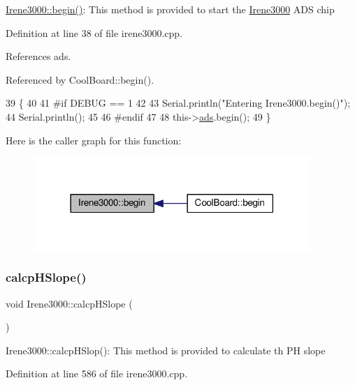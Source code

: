 \hyperlink{classIrene3000_ad5891806c500ae1007afe52b9e304c2b}{Irene3000\+::begin()}\+: This method is provided to start the \hyperlink{classIrene3000}{Irene3000} A\+DS chip 

Definition at line 38 of file irene3000.\+cpp.



References ads.



Referenced by Cool\+Board\+::begin().


\begin{DoxyCode}
39 \{
40 
41 \textcolor{preprocessor}{#if DEBUG == 1 }
42 
43     Serial.println(\textcolor{stringliteral}{"Entering Irene3000.begin()"});
44     Serial.println();
45 
46 \textcolor{preprocessor}{#endif}
47 
48     this->\hyperlink{classIrene3000_a1215e77ba761c9908d80d691f149e135}{ads}.begin();
49 \}
\end{DoxyCode}
Here is the caller graph for this function\+:\nopagebreak
\begin{figure}[H]
\begin{center}
\leavevmode
\includegraphics[width=297pt]{classIrene3000_ad5891806c500ae1007afe52b9e304c2b_icgraph}
\end{center}
\end{figure}
\mbox{\label{classIrene3000_a81f6a79e546679692053f7ac1af49613}} 
\subsubsection{\texorpdfstring{calcp\+H\+Slope()}{calcpHSlope()}}
{\footnotesize\ttfamily void Irene3000\+::calcp\+H\+Slope (\begin{DoxyParamCaption}{ }\end{DoxyParamCaption})}

Irene3000\+::calcp\+H\+Slop()\+: This method is provided to calculate th PH slope 

Definition at line 586 of file irene3000.\+cpp.



